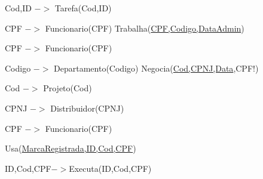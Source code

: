 \documentclass{article}
\begin{document}
\hspace{2cm}Cod,ID $->$ Tarefa(Cod,ID)


\hspace{2cm}CPF $->$ Funcionario(CPF)
\newline\newline
Trabalha(\underline{CPF,Codigo,DataAdmin})

\hspace{2cm}CPF $->$ Funcionario(CPF)

\hspace{2cm}Codigo $->$ Departamento(Codigo)
\newline\newline
Negocia(\underline{Cod,CPNJ,Data},CPF!)

\hspace{2cm}Cod $->$ Projeto(Cod)

\hspace{2cm}CPNJ $->$ Distribuidor(CPNJ)

\hspace{2cm}CPF $->$ Funcionario(CPF)
\newline\newline

Usa(\underline{MarcaRegistrada,ID,Cod,CPF})

\hspace{2cm}ID,Cod,CPF$->$Executa(ID,Cod,CPF)
\end{document}
